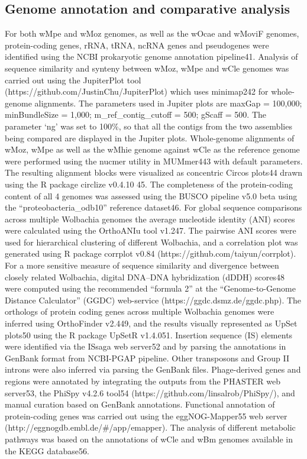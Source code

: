 \documentclass[10pt, a4paper, twocolumn]{article} %
\begin{document}
\subsection{Genome annotation and comparative analysis}
For both wMpe and wMoz genomes, as well as the wOcae and wMoviF genomes, protein-coding genes, rRNA, tRNA, ncRNA genes and pseudogenes were identified using the NCBI prokaryotic genome annotation pipeline41. Analysis of sequence similarity and synteny between wMoz, wMpe and wCle genomes was carried out using the JupiterPlot tool (https://github.com/JustinChu/JupiterPlot) which uses minimap242 for whole-genome alignments. The parameters used in Jupiter plots are maxGap = 100,000; minBundleSize = 1,000; m\_ref\_contig\_cutoff = 500; gScaff = 500. The parameter ‘ng’ was set to 100\%, so that all the contigs from the two assemblies being compared are displayed in the Jupiter plots. Whole-genome alignments of wMoz, wMpe as well as the wMhie genome against wCle as the reference genome were performed using the nucmer utility in MUMmer443 with default parameters. The resulting alignment blocks were visualized as concentric Circos plots44 drawn using the R package circlize v0.4.10 45. The completeness of the protein-coding content of all 4 genomes was assessed using the BUSCO pipeline v5.0 beta using the “proteobacteria\_odb10” reference dataset46. For global sequence comparisons across multiple Wolbachia genomes the average nucleotide identity (ANI) scores were calculated using the OrthoANIu tool v1.247. The pairwise ANI scores were used for hierarchical clustering of different Wolbachia, and a correlation plot was generated using R package corrplot v0.84 (https://github.com/taiyun/corrplot). For a more sensitive measure of sequence similarity and divergence between closely related Wolbachia, digital DNA–DNA hybridization (dDDH) scores48 were computed using the recommended “formula 2” at the “Genome-to-Genome Distance Calculator” (GGDC) web-service (https://ggdc.dsmz.de/ggdc.php). The orthologs of protein coding genes across multiple Wolbachia genomes were inferred using OrthoFinder v2.449, and the results visually represented as UpSet plots50 using the R package UpSetR v1.4.051. 
Insertion sequence (IS) elements were identified via the ISsaga web server52 and by parsing the annotations in GenBank format from NCBI-PGAP pipeline. Other transposons and Group II introns were also inferred via parsing the GenBank files. Phage-derived genes and regions were annotated by integrating the outputs from the PHASTER web server53, the PhiSpy v4.2.6 tool54 (https://github.com/linsalrob/PhiSpy/), and manual curation based on GenBank annotations. Functional annotation of protein-coding genes was carried out using the eggNOG-Mapper55 web server (http://eggnogdb.embl.de/\#/app/emapper). The analysis of different metabolic pathways was based on the annotations of wCle and wBm genomes available in the KEGG database56. 
\end{document}
